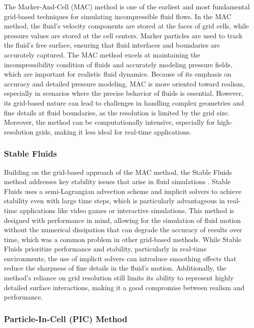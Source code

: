 The Marker-And-Cell (MAC) method is one of the earliest and most fundamental grid-based techniques for simulating incompressible fluid flows. In the MAC method, the fluid's velocity components are stored at the faces of grid cells, while pressure values are stored at the cell centers. Marker particles are used to track the fluid's free surface, ensuring that fluid interfaces and boundaries are accurately captured. The MAC method excels at maintaining the incompressibility condition of fluids and accurately modeling pressure fields, which are important for realistic fluid dynamics. Because of its emphasis on accuracy and detailed pressure modeling, MAC is more oriented toward realism, especially in scenarios where the precise behavior of fluids is essential. However, its grid-based nature can lead to challenges in handling complex geometries and fine details at fluid boundaries, as the resolution is limited by the grid size. Moreover, the method can be computationally intensive, especially for high-resolution grids, making it less ideal for real-time applications.

\subsubsection{Stable Fluids}

Building on the grid-based approach of the MAC method, the Stable Fluids method addresses key stability issues that arise in fluid simulations \cite{Stam1999}. Stable Fluids uses a semi-Lagrangian advection scheme and implicit solvers to achieve stability even with large time steps, which is particularly advantageous in real-time applications like video games or interactive simulations. This method is designed with performance in mind, allowing for the simulation of fluid motion without the numerical dissipation that can degrade the accuracy of results over time, which was a common problem in other grid-based methods. While Stable Fluids prioritize performance and stability, particularly in real-time environments, the use of implicit solvers can introduce smoothing effects that reduce the sharpness of fine details in the fluid's motion. Additionally, the method's reliance on grid resolution still limits its ability to represent highly detailed surface interactions, making it a good compromise between realism and performance.

\subsubsection{Particle-In-Cell (PIC) Method}

